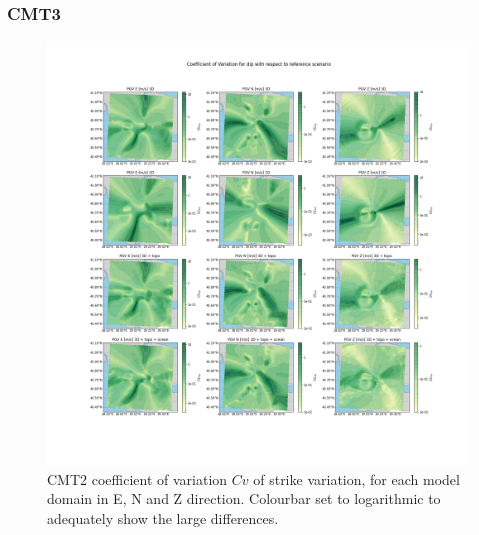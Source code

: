 \documentclass[../Text/00main.tex]{subfiles}
\begin{document}
\subsubsection{CMT3}
\begin{figure}
    \centering
    \includegraphics[width=1.2\linewidth]{images_results/dip_variation_sigma_sc2.png}
    \caption{CMT2 coefficient of variation $Cv$ of strike variation, for each model domain in E, N and Z direction. Colourbar set to logarithmic to adequately show the large differences.}
    \label{fig:cmt2sigm}
\end{figure}
\end{document}
